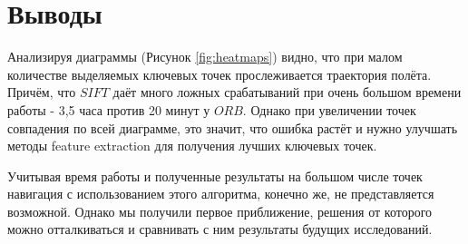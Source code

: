 \section{Выводы}

Анализируя диаграммы (Рисунок \ref{fig:heatmaps}) видно, что при малом количестве выделяемых ключевых точек прослеживается траектория полёта. Причём, что $SIFT$ даёт много ложных срабатываний при очень большом времени работы - 3,5 часа против 20 минут у $ORB$. Однако при увеличении точек совпадения  по всей диаграмме, это значит, что ошибка растёт и нужно улучшать методы feature extraction для получения лучших ключевых точек.

Учитывая время работы и полученные результаты на большом числе точек навигация с использованием этого алгоритма, конечно же, не представляется возможной. Однако мы получили первое приближение, решения  от которого можно отталкиваться и сравнивать с ним результаты будущих исследований.

\newpage